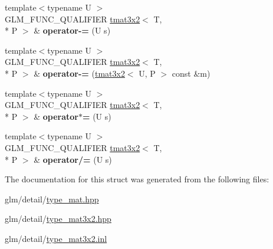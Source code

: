 \begin{DoxyCompactItemize}
\item 
\hypertarget{structglm_1_1tmat3x2_a94092701c91edec5ab93035af7a3422b}{{\footnotesize template$<$typename U $>$ }\\G\-L\-M\-\_\-\-F\-U\-N\-C\-\_\-\-Q\-U\-A\-L\-I\-F\-I\-E\-R \hyperlink{structglm_1_1tmat3x2}{tmat3x2}$<$ T, \\*
P $>$ \& {\bfseries operator-\/=} (U s)}\label{structglm_1_1tmat3x2_a94092701c91edec5ab93035af7a3422b}

\item 
\hypertarget{structglm_1_1tmat3x2_a192437e717b337e5dead355382eb0fa4}{{\footnotesize template$<$typename U $>$ }\\G\-L\-M\-\_\-\-F\-U\-N\-C\-\_\-\-Q\-U\-A\-L\-I\-F\-I\-E\-R \hyperlink{structglm_1_1tmat3x2}{tmat3x2}$<$ T, \\*
P $>$ \& {\bfseries operator-\/=} (\hyperlink{structglm_1_1tmat3x2}{tmat3x2}$<$ U, P $>$ const \&m)}\label{structglm_1_1tmat3x2_a192437e717b337e5dead355382eb0fa4}

\item 
\hypertarget{structglm_1_1tmat3x2_ae9ca1018839d8c718c7bdd0fa2d808ff}{{\footnotesize template$<$typename U $>$ }\\G\-L\-M\-\_\-\-F\-U\-N\-C\-\_\-\-Q\-U\-A\-L\-I\-F\-I\-E\-R \hyperlink{structglm_1_1tmat3x2}{tmat3x2}$<$ T, \\*
P $>$ \& {\bfseries operator$\ast$=} (U s)}\label{structglm_1_1tmat3x2_ae9ca1018839d8c718c7bdd0fa2d808ff}

\item 
\hypertarget{structglm_1_1tmat3x2_a9c34c87d7b9be6e3301bc8e9186c96bf}{{\footnotesize template$<$typename U $>$ }\\G\-L\-M\-\_\-\-F\-U\-N\-C\-\_\-\-Q\-U\-A\-L\-I\-F\-I\-E\-R \hyperlink{structglm_1_1tmat3x2}{tmat3x2}$<$ T, \\*
P $>$ \& {\bfseries operator/=} (U s)}\label{structglm_1_1tmat3x2_a9c34c87d7b9be6e3301bc8e9186c96bf}

\end{DoxyCompactItemize}


The documentation for this struct was generated from the following files\-:\begin{DoxyCompactItemize}
\item 
glm/detail/\hyperlink{type__mat_8hpp}{type\-\_\-mat.\-hpp}\item 
glm/detail/\hyperlink{type__mat3x2_8hpp}{type\-\_\-mat3x2.\-hpp}\item 
glm/detail/\hyperlink{type__mat3x2_8inl}{type\-\_\-mat3x2.\-inl}\end{DoxyCompactItemize}

